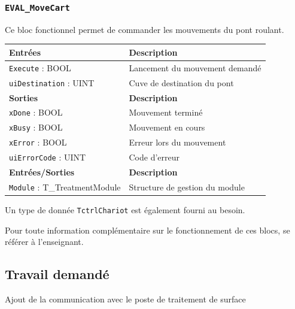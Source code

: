 \subsubsection{\texttt{EVAL\_MoveCart}}
Ce bloc fonctionnel permet de commander les mouvements du pont roulant.

\begin{tabular}{l|l}
\textbf{Entrées} & \textbf{Description} \\\hline
\texttt{Execute} : BOOL  & Lancement du mouvement demandé \\
\texttt{uiDestination} : UINT & Cuve de destination du pont \\\hline\hline
\textbf{Sorties} & \textbf{Description} \\\hline
\texttt{xDone} : BOOL & Mouvement terminé \\
\texttt{xBusy} : BOOL & Mouvement en cours \\
\texttt{xError} : BOOL & Erreur lors du mouvement \\\hline\hline
\texttt{uiErrorCode} : UINT & Code d'erreur \\\hline\hline
\textbf{Entrées/Sorties} & \textbf{Description} \\\hline
\texttt{Module} : T\_TreatmentModule & Structure de gestion du module \\\hline\hline
\end{tabular}

Un type de donnée \texttt{TctrlChariot} est également fourni au besoin. 

Pour toute information complémentaire sur le fonctionnement de ces blocs, se référer à l'enseignant.

\subsection{Travail demandé}

\begin{UPSTIManipulation}{Ajout de la communication avec le poste de traitement de surface}

     
\end{UPSTIManipulation}

